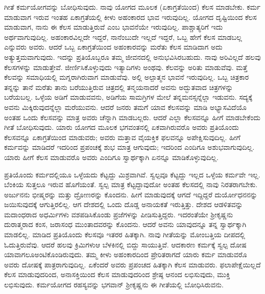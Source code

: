 ಗೀತೆ ಕರ್ಮಯೋಗವನ್ನು ಬೋಧಿಸುವುದು. ನಾವು ಯೋಗದ ಮೂಲಕ (ಏಕಾಗ್ರತೆಯಿಂದ) ಕೆಲಸ ಮಾಡಬೇಕು. ಕರ್ಮ ಮಾಡುವಾಗ ಇರುವ ಇಂತಹ ಏಕಾಗ್ರತೆಯಲ್ಲಿ ಕೀಳು ಅಹಂಕಾರದ ಭಾವ ಇರುವುದಿಲ್ಲ. ಯೋಗದ ದೃಷ್ಟಿಯಿಂದ ಕೆಲಸ ಮಾಡುವಾಗ, ನಾನು ಈ ಕೆಲಸ ಮಾಡುತ್ತಿರುವೆ ಎಂಬ ಭಾವನೆಯೇ ಇರುವುದಿಲ್ಲ. ಪಾಶ್ಚಾತ್ಯರಿಗೆ ಇದು ಅರ್ಥವಾಗುವುದಿಲ್ಲ. ಅಹಂಕಾರವಿಲ್ಲದೇ ಇದ್ದರೆ, ನಾನೆಂಬುದೇ ಇಲ್ಲದೆ ಇದ್ದರೆ, ಒಬ್ಬ ಹೇಗೆ ಕೆಲಸ ಮಾಡಬಲ್ಲ ಎನ್ನುವರು ಅವರು. ಆದರೆ ಒಬ್ಬ ಏಕಾಗ್ರತೆಯಿಂದ ಅಹಂಕಾರವನ್ನು ಮರೆತು ಕೆಲಸ ಮಾಡಿದಾಗ ಅದು ಅತ್ಯುತ್ತಮವಾಗುವುದು. ಇದನ್ನು ಪ್ರತಿಯೊಬ್ಬರೂ ತಮ್ಮ ಜೀವನದಲ್ಲಿ ಅನುಭವಿಸಿರಬಹುದು. ನಾವು ಅರಿವಿಲ್ಲದೆ ಹಲವು ಕೆಲಸಗಳನ್ನು ಮಾಡುತ್ತೇವೆ. ಜೀರ್ಣಿಸಿಕೊಳ್ಳುವುದು ಇತ್ಯಾದಿಗಳು ಅಂಥವು. ಕೆಲವನ್ನು ಅರಿತು ಮಾಡುವೆವು. ಮತ್ತೆ ಕೆಲವನ್ನು ಸಮಾಧಿಯಲ್ಲಿ ಮಗ್ನರಾಗಿರುವಾಗ ಮಾಡುವೆವು. ಅಲ್ಲಿ ಅಲ್ಪಾತ್ಮನ ಭಾವನೆ ಇರುವುದಿಲ್ಲ. ಒಬ್ಬ ಚಿತ್ರಕಾರ ತನ್ನನ್ನು ತಾನೆ ಮರೆತು ತಾನು ಬರೆಯುತ್ತಿರುವ ಚಿತ್ರದಲ್ಲಿ ತನ್ಮಯನಾದರೆ ಅವನು ಅದ್ಭುತವಾದ ಚಿತ್ರಗಳನ್ನು ಬರೆಯಬಲ್ಲ. ಒಳ್ಳೆಯ ಅಡಿಗೆ ಮಾಡುವವನು, ಅಡಿಗೆಯ ಸಾಮಗ್ರಿಗಳ ಮೇಲೆ ತನ್ನ\break ಮನಸ್ಸನ್ನೆಲ್ಲಾ ಇಡುವನು. ಸದ್ಯಕ್ಕೆ ಅವನು ಮಿಕ್ಕಿರುವುದನ್ನೆಲ್ಲಾ ಮರೆಯುವನು. ಆದರೆ ಜನರು ತಮಗೆ ಯಾವ ಕೆಲಸವನ್ನು ಮಾಡಿ ಅಭ್ಯಾಸವಿದೆಯೊ ಅಂತಹ ಒಂದು ಕೆಲಸವನ್ನು ಮಾತ್ರ ಅವರು ಚೆನ್ನಾಗಿ ಮಾಡಬಲ್ಲರು. ಆದರೆ ಎಲ್ಲಾ ಕೆಲಸವನ್ನೂ ಹೀಗೆ ಮಾಡಬೇಕೆಂದು ಗೀತೆ ಬೋಧಿಸುವುದು. ಯಾರು ಯೋಗದ ಮೂಲಕ ಭಗವಂತನಲ್ಲಿ ಏಕವಾಗಿರುವರೊ ಅವರು ಪ್ರತಿಯೊಂದು ಕೆಲಸವನ್ನೂ ಏಕಾಗ್ರತೆಯಿಂದ ಮಾಡುವರು; ಅವರು ಮತ್ತಾವ ವೈಯಕ್ತಿಕ ಫಲವನ್ನೂ ಅಪೇಕ್ಷಿಸುವುದಿಲ್ಲ. ಹೀಗೆ ಕರ್ಮವನ್ನು ಮಾಡಿದರೆ ಇದರಿಂದ ಪ್ರಪಂಚಕ್ಕೆ ಶುಭ ಮಾತ್ರ ಆಗುವುದು; ಇದರಿಂದ ಎಂದಿಗೂ ಅಶುಭವಾಗುವುದಿಲ್ಲ. ಯಾರು ಹೀಗೆ ಕೆಲಸ ಮಾಡುವರೊ ಅವರು ಎಂದಿಗೂ ಸ್ವಾರ್ಥಕ್ಕಾಗಿ ಏನನ್ನೂ ಮಾಡಿಕೊಳ್ಳುವುದಿಲ್ಲ.

ಪ್ರತಿಯೊಂದು ಕರ್ಮದಲ್ಲಿಯೂ ಒಳ್ಳೆಯದು ಕೆಟ್ಟದ್ದು ಮಿಶ್ರವಾಗಿವೆ. ಸ್ವಲ್ಪವೂ ಕೆಟ್ಟದ್ದು ಇಲ್ಲದ ಒಳ್ಳೆಯ ಕರ್ಮವೇ ಇಲ್ಲ. ಬೆಂಕಿಯ ಸುತ್ತಲೂ ಇರುವ ಹೊಗೆಯಂತೆ. ಸ್ವಲ್ಪ ಮಾತ್ರ ಕೆಟ್ಟದ್ದಾವುದೋ ಅಂತಹ ಕೆಲಸದಲ್ಲಿ ನಾವು ನಿರತರಾಗಬೇಕು. ಅರ್ಜುನನು ಭೀಷ್ಮರನ್ನು ಮತ್ತು ದ್ರೋಣರನ್ನು ಕೊಂದನು. ಹೀಗೆ ಮಾಡುವುದಕ್ಕೆ ಆಗದೆ ಇದ್ದಿದ್ದರೆ ದುರ್ಯೋಧನನನ್ನು ಜಯಿಸುವುದಕ್ಕೆ ಆಗುತ್ತಿರಲಿಲ್ಲ. ಆಗ ದೇಶದಲ್ಲಿ ಒಂದು ದೊಡ್ಡ ಅನಾಯಕತೆ ಇರುತ್ತಿತ್ತು. ದೇಶದ ಆಡಳಿತವನ್ನು ಮದಾಂಧರಾದ ಅಧರ್ಮಿಗಳು ವಶಪಡಿಸಿಕೊಂಡು ಪ್ರಜೆಗಳನ್ನು ಪೀಡಿಸುತ್ತಿದ್ದರು. ಇದರಂತೆಯೇ ಶ‍್ರೀಕೃಷ್ಣನು ದುರಾತ್ಮರಾದ ಕಂಸ, ಜರಾಸಂಧ ಮುಂತಾದವರನ್ನು ಕೊಂದನು. ಆದರೆ ಅವನು ಯಾವುದನ್ನೂ ತನ್ನ ಸ್ವಾರ್ಥಕ್ಕಾಗಿ ಮಾಡಲಿಲ್ಲ. ಮಾಡಿದ ಪ್ರತಿಯೊಂದು ಕೆಲಸವೂ ಇತರರ ಹಿತಕ್ಕಾಗಿ. ನಾವು ಗೀತೆಯನ್ನು ಮೋಂಬತ್ತಿಯ ದೀಪದಲ್ಲಿ ಓದುತ್ತಿರುವೆವು. ಆದರೆ ಹಲವು ಕ್ರಿಮಿಗಳು\break ಆ ಬೆಳಕಿನಲ್ಲಿ ಬಿದ್ದು ಸಾಯುತ್ತಿವೆ. ಆದಕಾರಣ ಕರ್ಮಕ್ಕೆ ಸ್ವಲ್ಪ ದೋಷ ಯಾವಾಗಲೂ\break ಅಂಟಿಕೊಂಡಿರುವುದು. ತಮ್ಮ ಕೀಳು ಅಹಂಕಾರದಿಂದ ಪ್ರೇರಿತರಾಗದೆ ಯಾರು ಕರ್ಮ ಮಾಡುವರೊ ಅವರು ದೋಷಕ್ಕೆ ಪಾತ್ರರಾಗುವುದಿಲ್ಲ. ಏಕೆಂದರೆ ಅವರು ಪ್ರಪಂಚದ ಹಿತಕ್ಕಾಗಿ ಕೆಲಸ ಮಾಡುವರು. ಫಲಾಪೇಕ್ಷೆಯಿಲ್ಲದೆ ಕೆಲಸ ಮಾಡುವುದರಿಂದ, ಅನಾಸಕ್ತಿಯಿಂದ ಕೆಲಸ ಮಾಡುವುದರಿಂದ ಶ್ರೇಷ್ಠ ಆನಂದ ಲಭಿಸುವುದು, ಮುಕ್ತಿ ಲಭಿಸುವುದು. ಕರ್ಮಯೋಗದ ರಹಸ್ಯವನ್ನು ಭಗವಾನ್​ ಶ‍್ರೀಕೃಷ್ಣನು ಈ ಗೀತೆಯಲ್ಲಿ ಬೋಧಿಸಿರುವನು.

\vskip -0.5cm

